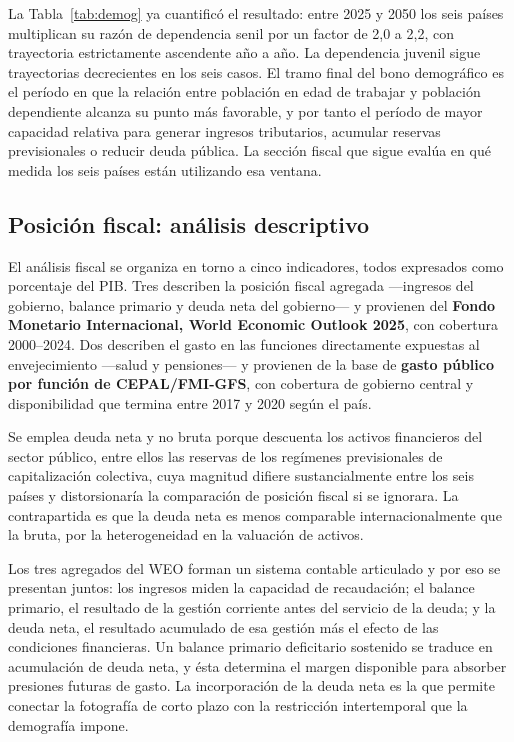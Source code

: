 \documentclass[12pt, letterpaper]{article}
\begin{document}
La Tabla~\ref{tab:demog} ya cuantificó el resultado: entre 2025 y 2050 los seis países
multiplican su razón de dependencia senil por un factor de 2,0 a 2,2, con trayectoria
estrictamente ascendente año a año. La dependencia juvenil sigue trayectorias
decrecientes en los seis casos. El tramo final del
bono demográfico es el período en que la relación entre población en edad de trabajar y población dependiente alcanza su punto más favorable, y por tanto el período de mayor
capacidad relativa para generar ingresos tributarios, acumular reservas previsionales o reducir deuda pública. La sección fiscal que sigue evalúa en qué medida los seis países están utilizando esa ventana.

\subsection{Posición fiscal: análisis descriptivo}
\label{sec:posicion-fiscal}

El análisis fiscal se organiza en torno a cinco indicadores, todos expresados como
porcentaje del PIB. Tres describen la posición fiscal agregada —ingresos del gobierno, balance primario y deuda neta del gobierno— y provienen del
\textbf{Fondo Monetario Internacional, World Economic Outlook 2025}, con cobertura 2000--2024. Dos describen el gasto en las funciones directamente expuestas al envejecimiento —salud y pensiones— y provienen de la base de
\textbf{gasto público por función de CEPAL/FMI-GFS}, con cobertura de gobierno central
y disponibilidad que termina entre 2017 y 2020 según el país.

Se emplea deuda neta y no bruta porque descuenta los activos financieros del sector
público, entre ellos las reservas de los regímenes previsionales de capitalización
colectiva, cuya magnitud difiere sustancialmente entre los seis países y
distorsionaría la comparación de posición fiscal si se ignorara. La contrapartida
es que la deuda neta es menos comparable internacionalmente que la bruta, por la
heterogeneidad en la valuación de activos.

Los tres agregados del WEO forman un sistema contable articulado y por eso se presentan
juntos: los ingresos miden la capacidad de recaudación; el balance primario, el resultado de la gestión corriente antes del servicio de la deuda; y la deuda neta, el
resultado acumulado de esa gestión más el efecto de las condiciones financieras. Un balance primario deficitario sostenido se traduce en acumulación de deuda neta, y ésta
determina el margen disponible para absorber presiones futuras de gasto. La
incorporación de la deuda neta es la que permite conectar la fotografía de corto plazo
con la restricción intertemporal que la demografía impone.
\end{document}
